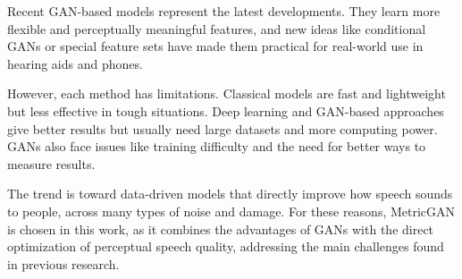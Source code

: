 Recent GAN-based models represent the latest developments. They learn more flexible and perceptually meaningful features, and new ideas like conditional GANs or special feature sets have made them practical for real-world use in hearing aids and phones.

However, each method has limitations. Classical models are fast and lightweight but less effective in tough situations. Deep learning and GAN-based approaches give better results but usually need large datasets and more computing power. GANs also face issues like training difficulty and the need for better ways to measure results.

The trend is toward data-driven models that directly improve how speech sounds to people, across many types of noise and damage. For these reasons, MetricGAN is chosen in this work, as it combines the advantages of GANs with the direct optimization of perceptual speech quality, addressing the main challenges found in previous research.